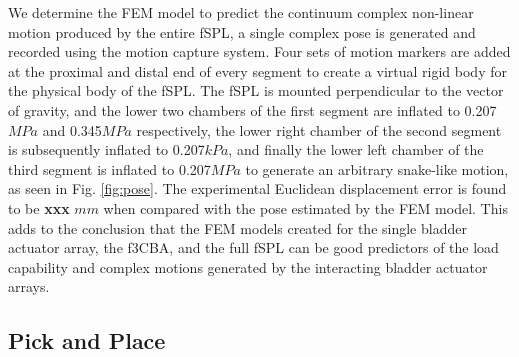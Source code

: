 \documentclass[letterpaper, 10 pt, conference]{ieeeconf}  %
\begin{document}
We determine the FEM model to predict the continuum complex non-linear motion produced by the entire fSPL, a single complex pose is generated and recorded using the motion capture system. Four sets of motion markers are added at the proximal and distal end of every segment to create a virtual rigid body for the physical body of the fSPL. The fSPL is mounted perpendicular to the vector of gravity, and the lower two chambers of the first segment are inflated to 0.207$MPa$ and 0.345$MPa$ respectively, the lower right chamber of the second segment is subsequently inflated to 0.207$kPa$, and finally the lower left chamber of the third segment is inflated to 0.207$MPa$ to generate an arbitrary snake-like motion, as seen in Fig. \ref{fig:pose}. The experimental Euclidean displacement error is found to be \textbf{xxx} $mm$ when compared with the pose estimated by the FEM model. This adds to the conclusion that the FEM models created for the single bladder actuator array, the f3CBA, and the full fSPL can be good predictors of the load capability and complex motions generated by the interacting bladder actuator arrays.
% 
% 









\subsection{Pick and Place}
\end{document}
